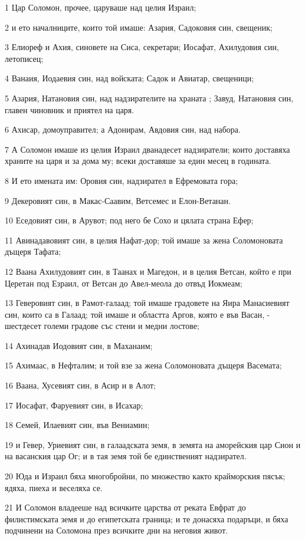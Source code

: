 \par 1 Цар Соломон, прочее, царуваше над целия Израил;
\par 2 и ето началниците, които той имаше: Азария, Садоковия син, свещеник;
\par 3 Елиореф и Ахия, синовете на Сиса, секретари; Иосафат, Ахилудовия син, летописец;
\par 4 Ванаия, Иодаевия син, над войската; Садок и Авиатар, свещеници;
\par 5 Азария, Натановия син, над надзирателите на храната ; Завуд, Натановия син, главен чиновник и приятел на царя.
\par 6 Ахисар, домоуправител; а Адонирам, Авдовия син, над набора.
\par 7 А Соломон имаше из целия Израил дванадесет надзиратели; които доставяха храните на царя и за дома му; всеки доставяше за един месец в годината.
\par 8 И ето имената им: Оровия син, надзирател в Ефремовата гора;
\par 9 Декеровият син, в Макас-Саавим, Ветсемес и Елон-Ветанан.
\par 10 Еседовият син, в Арувот; под него бе Сохо и цялата страна Ефер;
\par 11 Авинадавовият син, в целия Нафат-дор; той имаше за жена Соломоновата дъщеря Тафата;
\par 12 Ваана Ахилудовият син, в Таанах и Магедон, и в целия Ветсан, който е при Церетан под Езраил, от Ветсан до Авел-меола до отвъд Иокмеам;
\par 13 Геверовият син, в Рамот-галаад; той имаше градовете на Яира Манасиевият син, които са в Галаад; той имаше и областта Аргов, която е във Васан, - шестдесет големи градове със стени и медни лостове;
\par 14 Ахинадав Иодовият син, в Маханаим;
\par 15 Ахимаас, в Нефталим; и той взе за жена Соломоновата дъщеря Васемата;
\par 16 Ваана, Хусевият син, в Асир и в Алот;
\par 17 Иосафат, Фаруевият син, в Исахар;
\par 18 Семей, Илаевият син, във Вениамин;
\par 19 и Гевер, Уриевият син, в галаадската земя, в земята на аморейския цар Сион и на васанския цар Ог; и в тая земя той бе единственият надзирател.
\par 20 Юда и Израил бяха многобройни, по множество както крайморския пясък; ядяха, пиеха и веселяха се.
\par 21 И Соломон владееше над всичките царства от реката Евфрат до филистимската земя и до египетската граница; и те донасяха подаръци, и бяха подчинени на Соломона през всичките дни на неговия живот.
